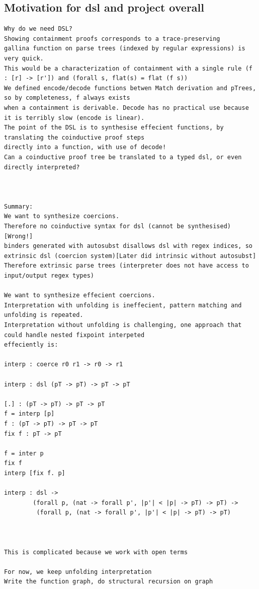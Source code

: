 \documentclass[a4paper,UKenglish,cleveref, autoref, thm-restate]{lipics-v2021}
\begin{document}
\subsection{Motivation for dsl and project overall}
\begin{verbatim}
Why do we need DSL?
Showing containment proofs corresponds to a trace-preserving 
gallina function on parse trees (indexed by regular expressions) is very quick.
This would be a characterization of containment with a single rule (f : [r] -> [r']) and (forall s, flat(s) = flat (f s))
We defined encode/decode functions betwen Match derivation and pTrees, so by completeness, f always exists 
when a containment is derivable. Decode has no practical use because it is terribly slow (encode is linear).
The point of the DSL is to synthesise effecient functions, by translating the coinductive proof steps
directly into a function, with use of decode!
Can a coinductive proof tree be translated to a typed dsl, or even directly interpreted?



Summary:
We want to synthesize coercions.
Therefore no coinductive syntax for dsl (cannot be synthesised) [Wrong!]
binders generated with autosubst disallows dsl with regex indices, so extrinsic dsl (coercion system)[Later did intrinsic without autosubst]
Therefore extrinsic parse trees (interpreter does not have access to input/output regex types)

We want to synthesize effecient coercions.
Interpretation with unfolding is ineffecient, pattern matching and unfolding is repeated.
Interpretation without unfolding is challenging, one approach that could handle nested fixpoint interpeted
effeciently is:

interp : coerce r0 r1 -> r0 -> r1

interp : dsl (pT -> pT) -> pT -> pT

[.] : (pT -> pT) -> pT -> pT
f = interp [p]
f : (pT -> pT) -> pT -> pT
fix f : pT -> pT

f = inter p
fix f
interp [fix f. p]

interp : dsl -> 
        (forall p, (nat -> forall p', |p'| < |p| -> pT) -> pT) ->
         (forall p, (nat -> forall p', |p'| < |p| -> pT) -> pT) 



This is complicated because we work with open terms

For now, we keep unfolding interpretation
Write the function graph, do structural recursion on graph







\end{verbatim}
\end{document}
